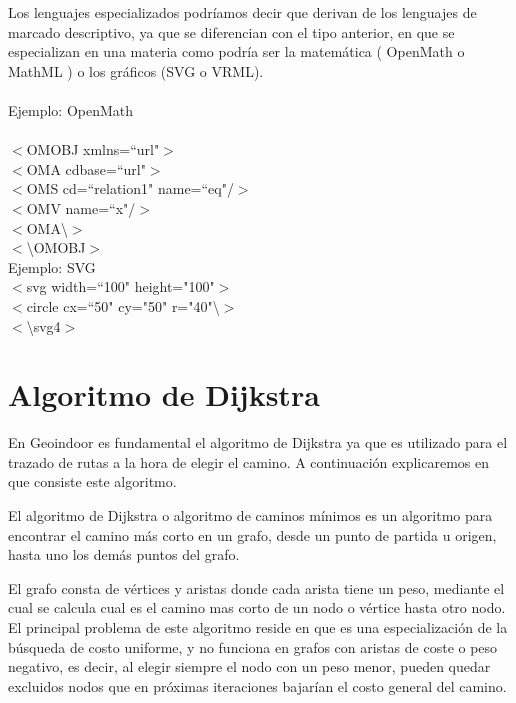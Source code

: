 Los lenguajes especializados podríamos decir que derivan de los lenguajes de marcado descriptivo, ya que se diferencian con el tipo anterior, en que se especializan en una materia como podría ser la matemática ( OpenMath o MathML ) \cite{noauthor_openmath_2017:e} \cite{noauthor_usos_2003:a} o los gráficos (SVG o VRML).
\\
\\
Ejemplo: OpenMath
\\
\\
$<$OMOBJ xmlns=``url"$>$
\\
 \tab $<$OMA cdbase=``url"$>$
 \\
    \tab\tab$<$OMS cd=``relation1" name=``eq"/$>$
    \\
   \tab\tab$<$OMV name=``x"/$>$
   \\
  \tab$<$OMA\textbackslash $>$
  \\
$<$\textbackslash OMOBJ$>$
\\
Ejemplo: SVG
\\
$<$svg width=``100" height="100"$>$
\\
  \tab$<$circle cx=``50" cy="50" r="40"\textbackslash $>$
  \\
$<$\textbackslash svg4$>$
\\

\section{Algoritmo de Dijkstra}\label{Dijkstra}
En Geoindoor es fundamental el algoritmo de Dijkstra ya que es utilizado para el trazado de rutas a la hora de elegir el camino.
A continuación explicaremos en que consiste este algoritmo.

El algoritmo de Dijkstra o algoritmo de caminos mínimos es un algoritmo para encontrar el camino más corto en un grafo, desde un punto de partida u origen, hasta uno los demás puntos del grafo.

El grafo consta de vértices y aristas donde cada arista tiene un peso, mediante el cual se calcula cual es el camino mas corto de un nodo o vértice hasta otro nodo. El principal problema de este algoritmo reside en que es una especialización de la búsqueda de costo uniforme, y no funciona en grafos con aristas de coste o peso negativo, es decir, al elegir siempre el nodo con un peso menor, pueden quedar excluidos nodos que en próximas iteraciones bajarían el costo general del camino. 
\\
\\
